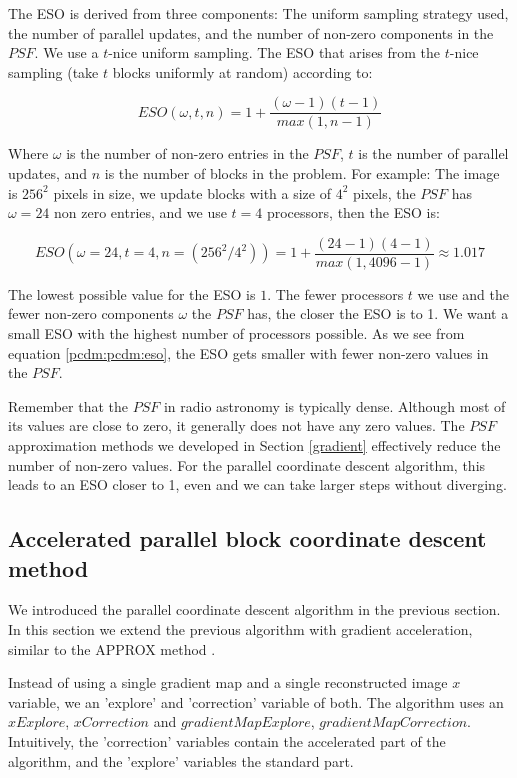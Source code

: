 The ESO is derived from three components: The uniform sampling strategy used, the number of parallel updates, and the number of non-zero components in the $PSF$. We use a $t$-nice uniform sampling. The ESO that arises from the $t$-nice sampling (take $t$ blocks uniformly at random) according to\cite{richtarik2016parallel}:

\begin{equation}\label{pcdm:pcdm:eso}
ESO(\omega, t, n) = 1+ \frac{(\omega - 1)(t - 1)}{max(1, n -1)}
\end{equation}

Where $\omega$ is the number of non-zero entries in the $PSF$, $t$ is the number of parallel updates, and $n$ is the number of blocks in the problem. For example: The image is $256^2$ pixels in size, we update blocks with a size of $4^2$ pixels, the $PSF$ has $\omega = 24$ non zero entries, and we use $t = 4$ processors, then the ESO is:

\begin{equation}
ESO(\omega = 24, t = 4, n = (256^2 / 4^2)) = 1+ \frac{(24 - 1)(4 - 1)}{max(1, 4096 -1)} \approx 1.017
\end{equation}

The lowest possible value for the ESO is $1$. The fewer processors $t$ we use and the fewer non-zero components $\omega$ the $PSF$ has, the closer the ESO is to 1. We want a small ESO with the highest number of processors possible. As we see from equation \eqref{pcdm:pcdm:eso}, the ESO gets smaller with fewer non-zero values in the $PSF$.

Remember that the $PSF$ in radio astronomy is typically dense. Although most of its values are close to zero, it generally does not have any zero values. The $PSF$ approximation methods we developed in Section \ref{gradient} effectively reduce the number of non-zero values. For the parallel coordinate descent algorithm, this leads to an ESO closer to 1, even  and we can take larger steps without diverging.


\subsection{Accelerated parallel block coordinate descent method}
We introduced the parallel coordinate descent algorithm in the previous section. In this section we extend the previous algorithm with gradient acceleration, similar to the APPROX method \cite{fercoq2015accelerated}.

Instead of using a single gradient map and a single reconstructed image $x$ variable, we an 'explore' and 'correction' variable of both. The algorithm uses an $xExplore$,  $xCorrection$ and $gradientMapExplore$, $gradientMapCorrection$. Intuitively, the 'correction' variables contain the accelerated part of the algorithm, and the 'explore' variables the standard part.

